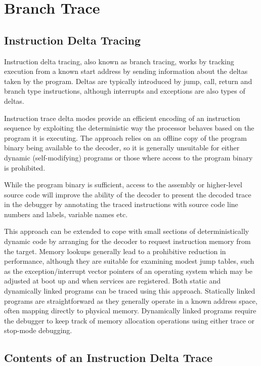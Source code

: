 \chapter{Branch Trace} \label{Branch Trace}


\section{Instruction Delta Tracing} \label{Delta Tracing}

Instruction delta tracing, also known as branch tracing, works by
tracking execution from a known start address by sending information
about the deltas taken by the program. Deltas are typically introduced
by jump, call, return and branch type instructions, although
interrupts and exceptions are also types of deltas.

Instruction trace delta modes provide an efficient encoding of an
instruction sequence by exploiting the deterministic way the processor
behaves based on the program it is executing. The approach relies on
an offline copy of the program binary being available to the decoder, so it
is generally unsuitable for either dynamic (self-modifying) programs
or those where access to the program binary is prohibited.

While the program binary is sufficient, access to the assembly or
higher-level source code will improve the ability of the decoder to present
the decoded trace in the debugger by annotating the traced instructions with
source code line numbers and labels, variable names etc.

This approach can be extended to cope with small sections of
deterministically dynamic code by arranging for the decoder to request
instruction memory from the target. Memory lookups generally lead to a
prohibitive reduction in performance, although they are suitable for
examining modest jump tables, such as the exception/interrupt vector
pointers of an operating system which may be adjusted at boot up and
when services are registered.  Both static and dynamically linked
programs can be traced using this approach. Statically linked programs
are straightforward as they generally operate in a known address
space, often mapping directly to physical memory. Dynamically linked
programs require the debugger to keep track of memory allocation
operations using either trace or stop-mode debugging.

\section{Contents of an Instruction Delta Trace} \label{Trace Contents}

